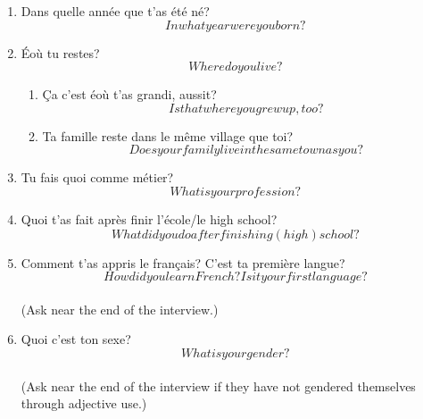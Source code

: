 
\ifdefined \longtrans
\else
  \newcommand{\longtrans}[1]{\[#1\]}
\fi

\begin{enumerate}
  \subsection{Demographics}
    \item Dans quelle année que t'as été né?\\
      \longtrans{In what year were you born?}
    \item Éoù tu restes?\\
      \longtrans{Where do you live?}
    \begin{enumerate}
      \item Ça c'est éoù t'as grandi, aussit?\\
        \longtrans{Is that where you grew up, too?}
      \item Ta famille reste dans le même village que toi?\\
        \longtrans{Does your family live in the same town as you?}
    \end{enumerate}
    \item Tu fais quoi comme métier?\\
      \longtrans{What is your profession?}
    \item Quoi t'as fait après finir l'école/le high school?\\
      \longtrans{What did you do after finishing (high) school?}
    \item Comment t'as appris le français? C'est ta première langue?\\
      \longtrans{How did you learn French? Is it your first language?}\\
      (Ask near the end of the interview.)
    \item Quoi c'est ton sexe?\\
      \longtrans{What is your gender?}\\
      (Ask near the end of the interview if they have not gendered themselves through adjective use.)

\end{enumerate}
